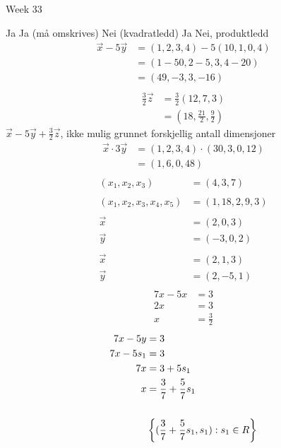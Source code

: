 
Week 33


Ja
Ja (må omskrives)
Nei (kvadratledd)
Ja
Nei, produktledd
\begin{align*}
\vec{x} -5\vec{y}&=(1,2,3,4)-5(10,1,0,4)\\
                 &=(1-50,2-5, 3, 4-20)\\
                 &=(49, -3, 3, -16)\\
\end{align*}
\begin{align*}
  \frac{3}{2}\vec{z} &= \frac{3}{2}(12,7,3)\\
                     &= (18, \frac{21}{2}, \frac{9}{2})
\end{align*}
$\vec{x}-5\vec{y}+\frac{3}{2}\vec{z}$, ikke mulig grunnet forskjellig antall dimensjoner
\begin{align*}
  \vec{x}\cdot 3 \vec{y}&=(1,2,3,4)\cdot (30,3,0,12)\\
                        &=(1,6,0,48)\\
\end{align*}
\begin{align*}
  (x_1, x_2, x_3) &=  (4,3,7)\\
  \\
  (x_1, x_2, x_3, x_4, x_5) &= (1,18,2,9,3)\\
  \\
  \vec{x} &= (2,0,3)\\
  \vec{y} &= (-3, 0, 2)\\
  \\
  \vec{x} &= (2,1,3)\\
  \vec{y} &= (2,-5,1)\\
\end{align*}
\begin{align*}
  7x-5x &= 3\\
  2x &= 3\\
  x &= \frac{3}{2}
\end{align*}
\begin{align*}
  7x-5y &= 3\\
  7x-5s_1&= 3\\
  7x &= 3+5s_1\\
  x &= \frac{3}{7} + \frac{5}{7}s_1\\
  \\
  &\left\{ (\frac{3}{7} + \frac{5}{7}s_1, s_1) : s_1 \in R \right \}\\
\end{align*}
